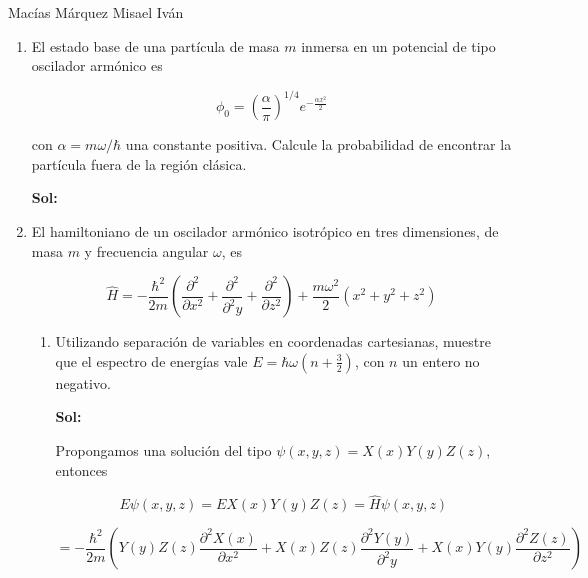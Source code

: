 \documentclass[12pt,a4paper]{article}
\begin{document}
Macías Márquez Misael Iván

\begin{enumerate}






\item El estado base de una partícula de masa $m$ inmersa en un potencial de tipo oscilador armónico es

\begin{equation*}
    \phi_0 = \left(\frac{\alpha}{\pi}\right)^{1/4} e^{-\frac{\alpha x^2}{2}}
\end{equation*}

con $\alpha = m \omega / \hbar$ una constante positiva. Calcule la probabilidad de encontrar la partícula fuera de la región clásica.

\textbf{Sol:}






\item El hamiltoniano de un oscilador armónico isotrópico en tres dimensiones, de masa $m$ y frecuencia angular $\omega$, es

\begin{equation*}
    \hat{H} = - \frac{\hbar^2}{2m} \left(\frac{\partial^2}{\partial x^2} + \frac{\partial^2}{\partial^2 y} + \frac{\partial^2}{\partial z^2}\right) + \frac{m \omega^2}{2} (x^2 + y^2 + z^2)
\end{equation*}

\begin{enumerate}
    \item Utilizando separación de variables en coordenadas cartesianas, muestre que el espectro de energías vale $E = \hbar \omega (n + \frac{3}{2})$, con $n$ un entero  no negativo.
    
    \textbf{Sol:}
    
    Propongamos una solución del tipo $\psi (x,y,z) =  X(x) Y(y) Z(z)$, entonces
    
    \begin{equation*}
        E\psi (x,y,z)= E X(x) Y(y) Z(z) = \hat{H} \psi (x,y,z) 
    \end{equation*}
    
    \begin{equation*}
        = - \frac{\hbar^2}{2m} \left(Y(y) Z(z)\frac{\partial^2 X(x)}{\partial x^2} +X(x) Z(z) \frac{\partial^2 Y(y)}{\partial^2 y} +X(x)Y(y) \frac{\partial^2 Z(z)}{\partial z^2}\right) 
    \end{equation*}
    

\end{enumerate}
\end{enumerate}
\end{document}

